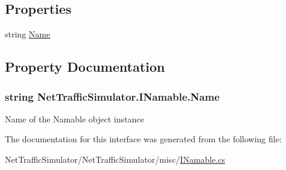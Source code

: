 \subsection*{Properties}
\begin{DoxyCompactItemize}
\item 
string \hyperlink{interfaceNetTrafficSimulator_1_1INamable_a533eb537abe688050cc25a28fbcb9d3f}{Name}
\end{DoxyCompactItemize}


\subsection{Property Documentation}
\hypertarget{interfaceNetTrafficSimulator_1_1INamable_a533eb537abe688050cc25a28fbcb9d3f}{
\subsubsection[{Name}]{\setlength{\rightskip}{0pt plus 5cm}string Net\-Traffic\-Simulator.\-I\-Namable.\-Name\hspace{0.3cm}{\ttfamily [get]}}}\label{interfaceNetTrafficSimulator_1_1INamable_a533eb537abe688050cc25a28fbcb9d3f}
Name of the Namable object instance 

The documentation for this interface was generated from the following file\-:\begin{DoxyCompactItemize}
\item 
Net\-Traffic\-Simulator/\-Net\-Traffic\-Simulator/misc/\hyperlink{INamable_8cs}{I\-Namable.\-cs}\end{DoxyCompactItemize}
